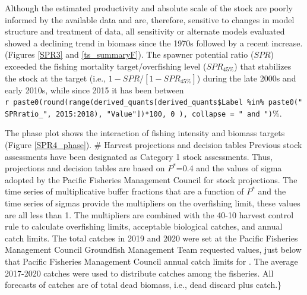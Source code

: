 \documentclass[11pt,
  english,
  a4paper,
]{article}
\begin{document}
\leavevmode\tagmcend\tagstructend\par


Although the estimated productivity and absolute scale of the stock are poorly informed by the available data and are, therefore, sensitive to changes in model structure and treatment of data, all sensitivity or alternate models evaluated showed a declining trend in biomass since the 1970s followed by a recent increase. (Figures \ref{SPR3} and \ref{ts_summaryF}). The spawner potential ratio ({\(SPR\)\leavevmode\tagmcend\tagstructend}) exceeded the fishing mortality target/overfishing level ({\(SPR_{45\%}\)\leavevmode\tagmcend\tagstructend}) that stabilizes the stock at the target (i.e., {\(1-SPR/[1-SPR_{45\%}]\)\leavevmode\tagmcend\tagstructend}) during the late 2000s and early 2010s, while since 2015 it has been between \texttt{r\ paste0(round(range(derived\_quants{[}derived\_quants\$Label\ \%in\%\ paste0("SPRratio\_",\ 2015:2018),\ "Value"{]})*100,\ 0\ ),\ collapse\ =\ "\ and\ ")}\%.

\leavevmode\tagmcend\tagstructend\par


The phase plot shows the interaction of fishing intensity and biomass targets (Figure \ref{SPR4_phase}). \# Harvest projections and decision tables Previous \spp stock assessments have been designated as Category 1 stock assessments. Thus, projections and decision tables are based on {\(P^*\)\leavevmode\tagmcend\tagstructend}=0.4 and the values of sigma adopted by the Pacific Fisheries Management Council for stock projections. The time series of multiplicative buffer fractions that are a function of {\(P^*\)\leavevmode\tagmcend\tagstructend} and the time series of sigmas provide the multipliers on the overfishing limit, these values are all less than 1. The multipliers are combined with the 40-10 harvest control rule to calculate overfishing limits, acceptable biological catches, and annual catch limits. The total catches in 2019 and 2020 were set at the Pacific Fisheries Management Council Groundfish Management Team requested values, just below that Pacific Fisheries Management Council annual catch limits for \spp. The average 2017-2020 catches were used to distribute catches among the fisheries. All forecasts of catches are of total dead biomass, i.e., dead discard plus catch.\}
\end{document}

